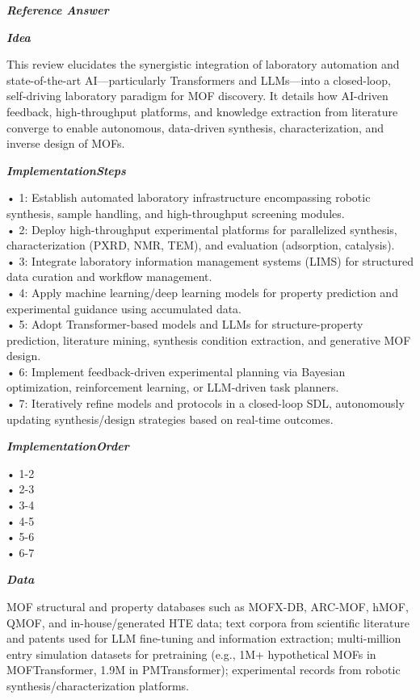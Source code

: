 \begin{tcolorbox}[
    breakable,
    title={Example of Idea Generation in Material},
    colback=LighterGray,
    colframe=DeepPurple,
    colbacktitle=DeepPurple,
    coltitle=White,
]
\textbf{\emph{\textcolor{DeepPurple}{Reference Answer}}}

\textbf{\emph{\textcolor{CaseOrange}{Idea}}}

This review elucidates the synergistic integration of laboratory automation and state-of-the-art
AI—particularly Transformers and LLMs—into a closed-loop, self-driving laboratory paradigm for MOF
discovery. It details how AI-driven feedback, high-throughput platforms, and knowledge extraction
from literature converge to enable autonomous, data-driven synthesis, characterization, and inverse
design of MOFs.

\textbf{\emph{\textcolor{CaseOrange}{ImplementationSteps}}}

• 1: Establish automated laboratory infrastructure encompassing robotic synthesis, sample handling, and high-throughput screening modules. \\
• 2: Deploy high-throughput experimental platforms for parallelized synthesis, characterization (PXRD, NMR, TEM), and evaluation (adsorption, catalysis). \\
• 3: Integrate laboratory information management systems (LIMS) for structured data curation and workflow management. \\
• 4: Apply machine learning/deep learning models for property prediction and experimental guidance using accumulated data. \\
• 5: Adopt Transformer-based models and LLMs for structure-property prediction, literature mining, synthesis condition extraction, and generative MOF design. \\
• 6: Implement feedback-driven experimental planning via Bayesian optimization, reinforcement learning, or LLM-driven task planners. \\
• 7: Iteratively refine models and protocols in a closed-loop SDL, autonomously updating synthesis/design strategies based on real-time outcomes. 

\textbf{\emph{\textcolor{CaseOrange}{ImplementationOrder}}}

• 1-2 \\
• 2-3 \\
• 3-4 \\
• 4-5 \\
• 5-6 \\
• 6-7 

\textbf{\emph{\textcolor{CaseOrange}{Data}}}

MOF structural and property databases such as MOFX-DB, ARC-MOF, hMOF, QMOF, and in-house/generated
HTE data; text corpora from scientific literature and patents used for LLM fine-tuning and
information extraction; multi-million entry simulation datasets for pretraining (e.g., 1M+
hypothetical MOFs in MOFTransformer, 1.9M in PMTransformer); experimental records from robotic
synthesis/characterization platforms.


\end{tcolorbox}
